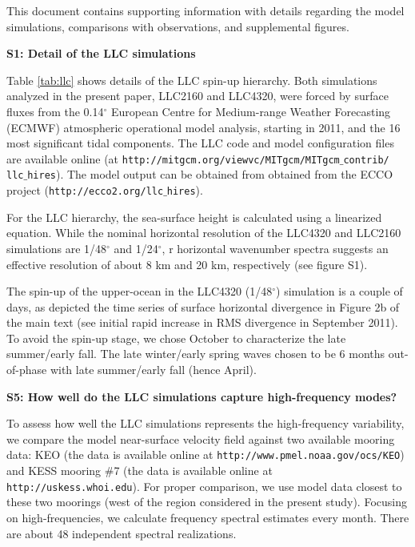 \documentclass[draft,grl]{agutexSI}
\begin{document}
\begin{article}
This document contains supporting information with details regarding the model
simulations, comparisons with observations, and supplemental figures.


\noindent\textbf{S1: Detail of the LLC simulations}

Table \ref{tab:llc} shows details of the LLC spin-up hierarchy.
Both simulations analyzed in the present paper, LLC2160 and LLC4320,
were forced by surface fluxes from the 0.14$^\circ$ European Centre for
Medium-range Weather Forecasting (ECMWF) atmospheric operational model analysis,
 starting in 2011, and the 16 most significant  tidal components.
The LLC code and model configuration files are available online
(at \texttt{http://mitgcm.org/viewvc/MITgcm/MITgcm$\_$contrib/
llc$\_$hires}). The model output can be obtained from  obtained from the ECCO project (\texttt{http://ecco2.org/llc$\_$hires}).

For the LLC hierarchy, the sea-surface height is calculated
using a linearized equation. While the nominal horizontal resolution  of the
LLC4320 and LLC2160 simulations are 1/48$^\circ$ and 1/24$^\circ$, r
horizontal wavenumber spectra suggests an effective resolution of about 8 km and 20 km,
 respectively (see figure S1).

The spin-up of the upper-ocean in the LLC4320 (1/48$^\circ$) simulation is
a couple of days, as depicted the time series of surface horizontal divergence
in Figure 2b of the main text (see initial rapid increase in RMS divergence in
September 2011). To avoid the spin-up stage, we chose October to characterize the
late summer/early fall. The late winter/early spring waves chosen to be 6 months
out-of-phase with late summer/early fall (hence April).

\noindent\textbf{S5: How well do the LLC simulations capture high-frequency modes?}

To assess how well the LLC simulations represents the high-frequency variability,
we compare the model near-surface velocity field against two available
mooring data: KEO (the data is available online at \texttt{http://www.pmel.noaa.gov/ocs/KEO})
and KESS mooring $\#$7 (the data is available online at \texttt{http://uskess.whoi.edu}).
For proper comparison, we use model data closest to these two moorings (west of
the region considered in the present study). Focusing on high-frequencies, we
calculate frequency spectral estimates every month. There are about 48 independent
spectral realizations.


\end{article}
\end{document}
